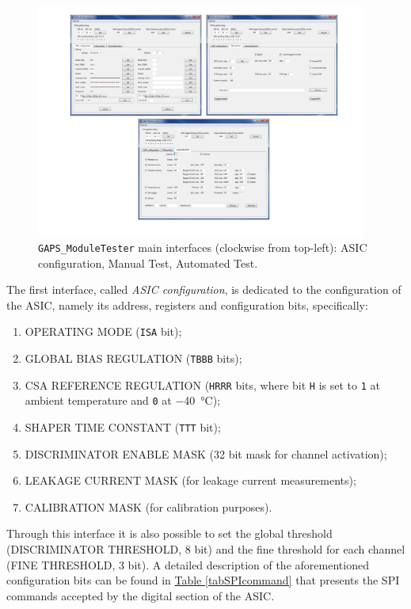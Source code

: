 \begin{figure}[h!]
    \centering
    \includegraphics[width=0.97\textwidth]{Images/chap2/moduletester.pdf}
    \caption{\texttt{GAPS\_ModuleTester} main interfaces (clockwise from top-left): ASIC configuration, Manual Test, Automated Test.}
    \label{figmodtest}
\end{figure}

\par
The first interface, called \textit{ASIC configuration}, is dedicated to the configuration of the ASIC, namely its address, registers and configuration bits, specifically:

\begin{enumerate}
    \itemsep0em 
    \item OPERATING MODE (\texttt{ISA} bit);
    \item GLOBAL BIAS REGULATION (\texttt{TBBB} bits); %
    \item CSA REFERENCE REGULATION (\texttt{HRRR} bits, where bit \texttt{H} is set to \texttt{1} at ambient temperature and \texttt{0} at \SI{-40}{\celsius});
    \item SHAPER TIME CONSTANT (\texttt{TTT} bit);
    \item DISCRIMINATOR ENABLE MASK (32 bit mask for channel activation);
    \item LEAKAGE CURRENT MASK (for leakage current measurements);
    \item CALIBRATION MASK (for calibration purposes).
\end{enumerate}

\noindent
Through this interface it is also possible to set the global threshold (DISCRIMINATOR THRESHOLD, 8 bit) and the fine threshold for each channel (FINE THRESHOLD, 3 bit). A detailed description of the aforementioned configuration bits can be found in \hyperref[tabSPIcommand]{Table \ref{tabSPIcommand}} that presents the SPI commands accepted by the digital section of the ASIC. 

